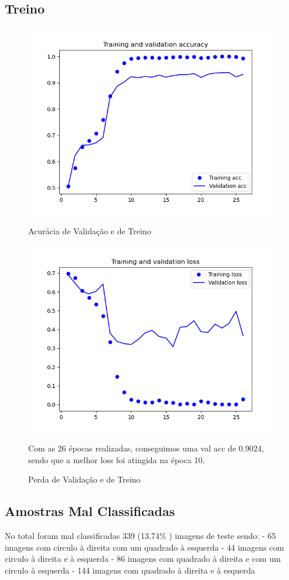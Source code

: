 \subsection{Treino}
\begin{figure}[H]
    \centering
    \includegraphics[width=\textwidth]{imgs//Test_7/7_1/train_test_acc.png}
    \caption{Acurácia de Validação e de Treino}
    \includegraphics[width=\textwidth]{imgs//Test_7/7_1/train_test_loss.png}
    \caption{Perda de Validação e de Treino}
    \label{fig:sub2}
    Com as 26 épocas realizadas, conseguimos uma val acc de 0.9024, sendo que a melhor loss foi atingida na época 10.
\end{figure}
\subsection{Amostras Mal Classificadas}
No total foram mal classificadas 339 (13.74\% ) imagens de teste sendo:
    - 65 imagens com circulo à direita com um quadrado à esquerda
    - 44 imagens com circulo à direita e à esquerda
    - 86 imagens com quadrado à direita e com um circulo à esquerda 
    - 144 imagens com quadrado à direita e à esquerda
    

